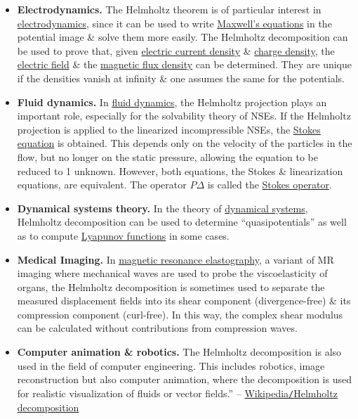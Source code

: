 \documentclass{article}
\begin{document}
\begin{itemize}
	\item {\bf Electrodynamics.} The Helmholtz theorem is of particular interest in \href{https://en.wikipedia.org/wiki/Electrodynamics}{electrodynamics}, since it can be used to write \href{https://en.wikipedia.org/wiki/Maxwell%27s_equations}{Maxwell's equations} in the potential image \& solve them more easily. The Helmholtz decomposition can be used to prove that, given \href{https://en.wikipedia.org/wiki/Electric_current_density}{electric current density} \& \href{https://en.wikipedia.org/wiki/Charge_density}{charge density}, the \href{https://en.wikipedia.org/wiki/Electric_field}{electric field} \& the \href{https://en.wikipedia.org/wiki/Magnetic_flux_density}{magnetic flux density} can be determined. They are unique if the densities vanish at infinity \& one assumes the same for the potentials.
	\item {\bf Fluid dynamics.} In \href{https://en.wikipedia.org/wiki/Fluid_dynamics}{fluid dynamics}, the Helmholtz projection plays an important role, especially for the solvability theory of NSEs. If the Helmholtz projection is applied to the linearized incompressible NSEs, the \href{https://en.wikipedia.org/wiki/Stokes_flow}{Stokes equation} is obtained. This depends only on the velocity of the particles in the flow, but no longer on the static pressure, allowing the equation to be reduced to 1 unknown. However, both equations, the Stokes \& linearization equations, are equivalent. The operator $P\Delta$ is called the \href{https://en.wikipedia.org/wiki/Stokes_operator}{Stokes operator}.
	\item {\bf Dynamical systems theory.} In the theory of \href{https://en.wikipedia.org/wiki/Dynamical_system}{dynamical systems}, Helmholtz decomposition can be used to determine ``quasipotentials'' as well as to compute \href{https://en.wikipedia.org/wiki/Lyapunov_function}{Lyapunov functions} in some cases. 
	\item {\bf Medical Imaging.} In \href{https://en.wikipedia.org/wiki/Magnetic_resonance_elastography}{magnetic resonance elastography}, a variant of MR imaging where mechanical waves are used to probe the viscoelasticity of organs, the Helmholtz decomposition is sometimes used to separate the measured displacement fields into its shear component (divergence-free) \& its compression component (curl-free). In this way, the complex shear modulus can be calculated without contributions from compression waves.
	\item {\bf Computer animation \& robotics.} The Helmholtz decomposition is also used in the field of computer engineering. This includes robotics, image reconstruction but also computer animation, where the decomposition is used for realistic visualization of fluids or vector fields.'' -- \href{https://en.wikipedia.org/wiki/Helmholtz_decomposition}{Wikipedia{\tt/}Helmholtz decomposition}
\end{itemize}
\end{document}
